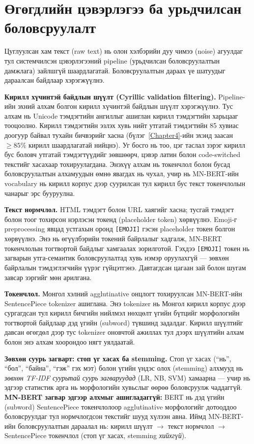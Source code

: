\section{Өгөгдлийн цэвэрлэгээ ба урьдчилсан боловсруулалт}

Цуглуулсан хам текст (raw text) нь олон хэлбэрийн дуу чимээ (noise) агуулдаг
тул системчилсэн цэвэрлэгээний pipeline (урьдчилсан боловсруулалтын дамжлага) зайлшгүй
шаардлагатай. Боловсруулалтын дараах үе шатуудыг дараалсан байдлаар хэрэгжүүлнэ.

\textbf{Кирилл хүчинтэй байдлын шүүлт (Cyrillic validation filtering).}
Pipeline-ийн эхний алхам болгон кирилл хүчинтэй байдлын шүүлт хэрэгжүүлнэ.
Тус алхам нь Unicode тэмдэгтийн ангиллыг ашиглан кирилл тэмдэгтийн харьцааг
тооцоолно. Кирилл тэмдэгтийн эзлэх хувь нийт утгатай тэмдэгтийн 85 хувиас
доогуур байвал тухайн бичвэрийг хасна (бүлэг~\ref{Chapter4}-ийн эхэнд заасан
$\geq 85\%$ кирилл шаардлагатай нийцнэ). Уг босго нь тоо, цэг таслал зэрэг кирилл бус боловч утгатай
тэмдэгтүүдийг зөвшөөрч, цэвэр латин болон code-switched текстийг хасахаар
тохируулагдана. Энэхүү алхам нь токенчлол болон бусад боловсруулалтын алхамуудын
өмнө явагдах нь чухал, учир нь MN-BERT-ийн vocabulary нь кирилл корпус дээр
суурилсан тул кирилл бус текст токенчлолын чанарыг эрс бууруулна.

\textbf{Текст нормчлол.} HTML тэмдэгт болон URL хаягийг хасна; тусгай тэмдэгт
болон тоог тохирсон нэрлэсэн токенд (placeholder token) хөрвүүлнэ. Emoji-г preprocessing явцад устгахын оронд \texttt{[EMOJI]} гэсэн placeholder
токен болгон хөрвүүлнэ. Энэ нь өгүүлбэрийн токений байрлалыг хадгалж,
MN-BERT токенчлолын тогтвортой байдлыг хамгаалах зорилготой. Гэхдээ
\texttt{[EMOJI]} токен нь загварын утга-семантик боловсруулалтад хувь нэмэр
оруулахгүй --- зөвхөн байрлалын тэмдэглэгчийн үүрэг гүйцэтгэнэ. Давтагдсан цагаан зай болон шугам завсар зэргийг
мөн арилгана.

\textbf{Токенчлол.} Монгол хэлний agglutinative онцлогт тохируулсан MN-BERT-ийн
SentencePiece tokenizer ашиглана. Энэ tokenizer нь Монгол кирилл корпус дээр
сургагдсан тул кирилл бичгийн нийлмэл нөхцөлт үгийн бүтцийг морфологийн
тогтвортой байдлаар дэд үгийн (subword) түвшинд задалдаг. Кирилл шүүлтийг давсан
өгөгдөл дээр тус tokenizer оновчтой ажиллах тул дээрх шүүлтийн алхам болон энэ
алхам хоорондоо нягт уялдаатай.

\textbf{Зөвхөн суурь загварт: стоп үг хасах ба stemming.} Стоп үг хасах
(``нь'', ``бол'', ``байна'', ``гэж'' гэх мэт) болон үгийн үндэс олох (stemming)
алхмууд нь \emph{зөвхөн TF-IDF суурьтай суурь загваруудад} (LR, NB, SVM)
хамаарна --- учир нь эдгээр статистик арга нь морфологийн хувьслыг өөрөө
боловсруулж чаддаггүй. \textbf{MN-BERT загвар эдгээр алхмыг ашигладаггүй:}
BERT нь дэд үгийн (subword) SentencePiece токенчлолоор agglutinative
морфологийг дотооддоо боловсруулдаг тул нормчлогдсон текстийг шууд хүлээн авна.
Иймд MN-BERT-ийн боловсруулалтын дараалал нь: кирилл шүүлт $\to$ текст нормчлол
$\to$ SentencePiece токенчлол (стоп үг хасах, stemming \emph{хийхгүй}).

